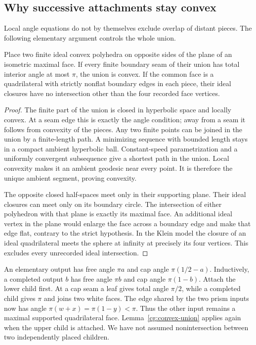 \subsection{Why successive attachments stay convex}
Local angle equations do not by themselves exclude overlap of
distant pieces. The following elementary argument controls the
whole union.

\begin{lemma}\label{cg:convex-union}
Place two finite ideal convex polyhedra on opposite sides of the
plane of an isometric maximal face. If every finite boundary seam
of their union has total interior angle at most $\pi$, the union
is convex. If the common face is a quadrilateral with strictly
nonflat boundary edges in each piece, their ideal closures have
no intersection other than the four recorded face vertices.
\end{lemma}
\begin{proof}
The finite part of the union is closed in hyperbolic space and
locally convex. At a seam edge this is exactly the angle condition;
away from a seam it follows from convexity of the pieces.
Any two finite points can be joined in the union by a finite-length
path. A minimizing sequence with bounded length stays in a compact
ambient hyperbolic ball. Constant-speed parametrization and a
uniformly convergent subsequence give a shortest path in the
union. Local convexity makes it an ambient geodesic near every
point. It is therefore the unique ambient segment, proving
convexity.

The opposite closed half-spaces meet only in their supporting plane.
Their ideal closures can meet only on its boundary circle.
The intersection of either polyhedron with that plane is exactly
its maximal face. An additional ideal vertex in the plane would
enlarge the face across a boundary edge and make that edge flat,
contrary to the strict hypothesis. In the Klein model the closure
of an ideal quadrilateral meets the sphere at infinity at precisely
its four vertices. This excludes every unrecorded ideal
intersection.
\end{proof}

An elementary output has free angle $\pi a$ and cap angle
$\pi(1/2-a)$. Inductively, a completed output $b$ has free angle
$\pi b$ and cap angle $\pi(1-b)$. Attach the lower child first.
At a cap seam a leaf gives total angle $\pi/2$, while a completed
child gives $\pi$ and joins two white faces. The edge shared by the
two prism inputs now has angle
$\pi(w+x)=\pi(1-y)<\pi$. Thus the other input remains a maximal
supported quadrilateral face. Lemma~\ref{cg:convex-union} applies
again when the upper child is attached. We have not assumed
nonintersection between two independently placed children.

